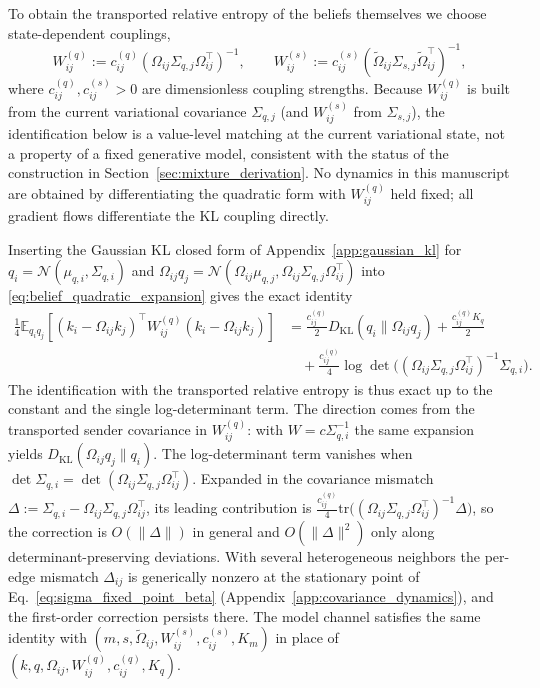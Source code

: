 To obtain the transported relative entropy of the beliefs themselves we choose state-dependent couplings,
\begin{equation}
W^{(q)}_{ij}:=c^{(q)}_{ij}(\Omega_{ij}\Sigma_{q,j}\Omega_{ij}^\top)^{-1},
\qquad
W^{(s)}_{ij}:=c^{(s)}_{ij}(\tilde{\Omega}_{ij}\Sigma_{s,j}\tilde{\Omega}_{ij}^\top)^{-1},
\end{equation}
where $c^{(q)}_{ij}, c^{(s)}_{ij} > 0$ are dimensionless coupling strengths. Because $W^{(q)}_{ij}$ is built from the current variational covariance $\Sigma_{q,j}$ (and $W^{(s)}_{ij}$ from $\Sigma_{s,j}$), the identification below is a value-level matching at the current variational state, not a property of a fixed generative model, consistent with the status of the construction in Section~\ref{sec:mixture_derivation}. No dynamics in this manuscript are obtained by differentiating the quadratic form with $W^{(q)}_{ij}$ held fixed; all gradient flows differentiate the KL coupling directly.

Inserting the Gaussian KL closed form of Appendix~\ref{app:gaussian_kl} for $q_i = \mathcal{N}(\mu_{q,i},\Sigma_{q,i})$ and $\Omega_{ij}q_j = \mathcal{N}(\Omega_{ij}\mu_{q,j}, \Omega_{ij}\Sigma_{q,j}\Omega_{ij}^\top)$ into \eqref{eq:belief_quadratic_expansion} gives the exact identity
\begin{equation}
\begin{aligned}
\frac{1}{4}\mathbb{E}_{q_i q_j}
[(k_i-\Omega_{ij}k_j)^\top W^{(q)}_{ij}(k_i-\Omega_{ij}k_j)]
&=
\frac{c^{(q)}_{ij}}{2}D_{\mathrm{KL}}(q_i\|\Omega_{ij}q_j)+\frac{c^{(q)}_{ij}K_q}{2}\\
&\quad+\frac{c^{(q)}_{ij}}{4}\log\det\big((\Omega_{ij}\Sigma_{q,j}\Omega_{ij}^\top)^{-1}\Sigma_{q,i}\big).
\end{aligned}
\label{eq:quadratic_kl_identity}
\end{equation}
The identification with the transported relative entropy is thus exact up to the constant and the single log-determinant term. The direction comes from the transported sender covariance in $W^{(q)}_{ij}$: with $W = c\Sigma_{q,i}^{-1}$ the same expansion yields $D_{\mathrm{KL}}(\Omega_{ij}q_j\|q_i)$. The log-determinant term vanishes when $\det\Sigma_{q,i} = \det(\Omega_{ij}\Sigma_{q,j}\Omega_{ij}^\top)$. Expanded in the covariance mismatch $\Delta := \Sigma_{q,i} - \Omega_{ij}\Sigma_{q,j}\Omega_{ij}^\top$, its leading contribution is $\tfrac{c^{(q)}_{ij}}{4}\mathrm{tr}\big((\Omega_{ij}\Sigma_{q,j}\Omega_{ij}^\top)^{-1}\Delta\big)$, so the correction is $O(\|\Delta\|)$ in general and $O(\|\Delta\|^2)$ only along determinant-preserving deviations. With several heterogeneous neighbors the per-edge mismatch $\Delta_{ij}$ is generically nonzero at the stationary point of Eq.~\eqref{eq:sigma_fixed_point_beta} (Appendix~\ref{app:covariance_dynamics}), and the first-order correction persists there. The model channel satisfies the same identity with $(m, s, \tilde\Omega_{ij}, W^{(s)}_{ij}, c^{(s)}_{ij}, K_m)$ in place of $(k, q, \Omega_{ij}, W^{(q)}_{ij}, c^{(q)}_{ij}, K_q)$.
